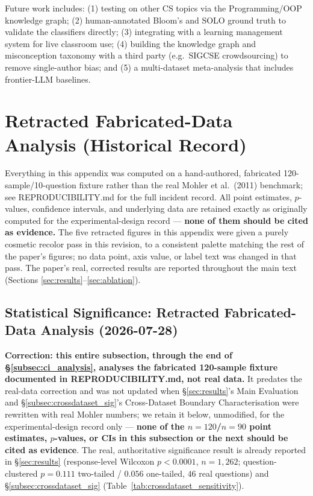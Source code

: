 \documentclass[conference]{IEEEtran}
\begin{document}
Future work includes: (1) testing on other CS topics via the
Programming/OOP knowledge graph; (2) human-annotated Bloom's and SOLO
ground truth to validate the classifiers directly; (3) integrating with
a learning management system for live classroom use; (4) building the
knowledge graph and misconception taxonomy with a third party (e.g.\
SIGCSE crowdsourcing) to remove single-author bias; and (5) a
multi-dataset meta-analysis that includes frontier-LLM baselines.

\appendices
\section{Retracted Fabricated-Data Analysis (Historical Record)}
\label{app:retracted}

Everything in this appendix was computed on a hand-authored, fabricated
120-sample/10-question fixture rather than the real Mohler et al.\
(2011) benchmark; see REPRODUCIBILITY.md for the full incident record.
All point estimates, $p$-values, confidence intervals, and underlying
data are retained exactly as originally computed for the
experimental-design record --- \textbf{none of them should be cited as
evidence.} The five retracted figures in this appendix were given a
purely cosmetic recolor pass in this revision, to a consistent palette
matching the rest of the paper's figures; no data point, axis value, or
label text was changed in that pass. The paper's real, corrected
results are reported throughout the main text (Sections
\ref{sec:results}--\ref{sec:ablation}).

\subsection{Statistical Significance: Retracted Fabricated-Data Analysis (2026-07-28)}
\label{subsec:significance}

\textbf{Correction: this entire subsection, through the end of
\S\ref{subsec:ci_analysis}, analyses the fabricated 120-sample fixture
documented in REPRODUCIBILITY.md, not real data.} It predates the
real-data correction and was not updated when \S\ref{sec:results}'s
Main Evaluation and \S\ref{subsec:crossdataset_sig}'s Cross-Dataset
Boundary Characterisation were rewritten with real Mohler numbers; we
retain it below, unmodified, for the experimental-design record only ---
\textbf{none of the $n=120$/$n=90$ point estimates, $p$-values, or CIs
in this subsection or the next should be cited as evidence}. The real,
authoritative significance result is already reported in
\S\ref{sec:results} (response-level Wilcoxon $p<0.0001$, $n=1{,}262$;
question-clustered $p=0.111$ two-tailed / $0.056$ one-tailed, $46$ real
questions) and \S\ref{subsec:crossdataset_sig} (Table~\ref{tab:crossdataset_sensitivity}).
\end{document}
